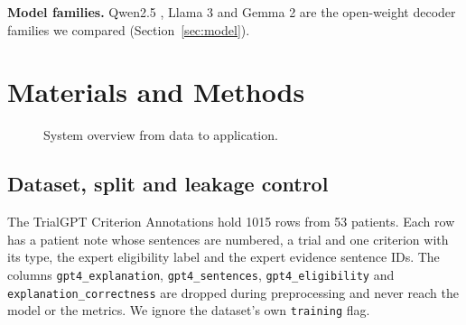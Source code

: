 \documentclass[conference]{IEEEtran}
\begin{document}
\textbf{Model families.} Qwen2.5 \cite{qwen2024qwen25}, Llama 3 \cite{dubey2024llama3} and Gemma 2 \cite{gemma2024gemma2} are the open-weight decoder families we compared (Section~\ref{sec:model}).

\section{Materials and Methods}
\begin{figure}[t]
\centering
{}
\caption{System overview from data to application.}
\label{fig:arch}
\end{figure}

\subsection{Dataset, split and leakage control}
The TrialGPT Criterion Annotations hold 1015 rows from 53 patients. Each row has a patient note whose sentences are numbered, a trial and one criterion with its type, the expert eligibility label and the expert evidence sentence IDs. The columns \texttt{gpt4\_explanation}, \texttt{gpt4\_sentences}, \texttt{gpt4\_eligibility} and \texttt{explanation\_correctness} are dropped during preprocessing and never reach the model or the metrics. We ignore the dataset's own \texttt{training} flag.
\end{document}
